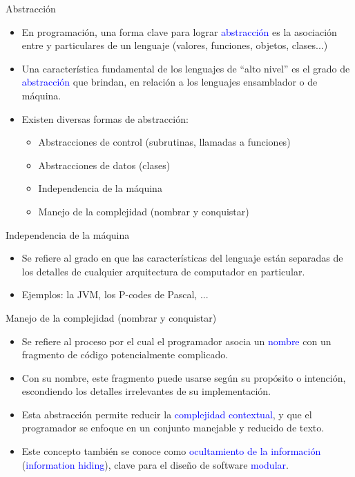 \documentclass{beamer} %
\newcommand{\blue}[1]{\textcolor{blue}{#1}}
\newcommand{\redb}[1]{{\color{red!70!black}{#1}}}
\begin{document}
\begin{frame}{Abstracción}
    \begin{itemize}
        \item<1-> En programación, una forma clave para lograr \blue{abstracción} es la asociación entre \redb{nombres} y \redb{entidades} particulares de un lenguaje (valores, funciones, objetos, clases...)
        \item<2-> Una característica fundamental de los lenguajes de ``alto nivel'' es el grado de \blue{abstracción} que brindan, en relación a los lenguajes ensamblador o de máquina.
        \item<3-> Existen diversas formas de abstracción:
        \begin{itemize}
            \item Abstracciones de control (subrutinas, llamadas a funciones)
            \item Abstracciones de datos (clases)
            \item Independencia de la máquina
            \item Manejo de la complejidad (nombrar y conquistar)
        \end{itemize}
    \end{itemize}
\end{frame}

\begin{frame}{Independencia de la máquina}
    \begin{itemize}
        \item<1-> Se refiere al grado en que las características del lenguaje están separadas de los detalles de cualquier arquitectura de computador en particular.
        \item<2-> Ejemplos: la JVM, los P-codes de Pascal, ...
    \end{itemize}
\end{frame}

\begin{frame}{Manejo de la complejidad (nombrar y conquistar)}
    \begin{itemize}
        \item<1-> Se refiere al proceso por el cual el programador asocia un \blue{nombre} con un fragmento de código potencialmente complicado.
        \item<2-> Con su nombre, este fragmento puede usarse según su propósito o intención, escondiendo los detalles irrelevantes de su implementación.
        \item<3-> Esta abstracción permite reducir la \blue{complejidad contextual}, y que el programador se enfoque en un conjunto manejable y reducido de texto.
        \item<4-> Este concepto también se conoce como \blue{ocultamiento de la información} (\blue{information hiding}), clave para el diseño de software \blue{modular}.
    \end{itemize}
\end{frame}
\end{document}
